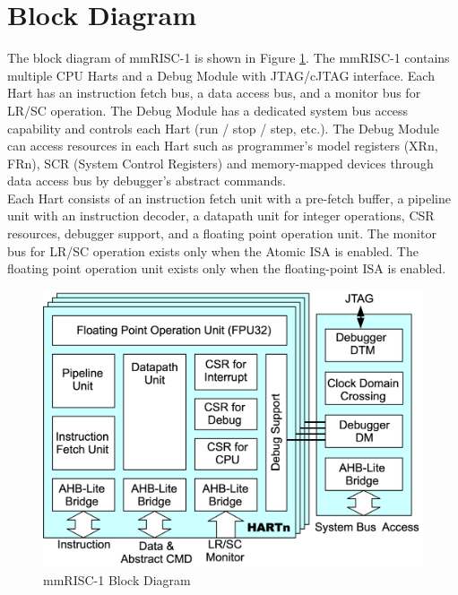 \section{Block Diagram}

The block diagram of  mmRISC-1 is shown in Figure \ref{fig:BLOCKDIAGRAM}. The mmRISC-1 contains multiple CPU Harts and a Debug Module with JTAG/cJTAG interface. Each Hart has an instruction fetch bus, a data access bus, and a monitor bus for LR/SC operation. The Debug Module has a dedicated system bus access capability and controls each Hart (run / stop / step, etc.). The Debug Module can access resources in each Hart such as programmer’s model registers (XRn, FRn), SCR (System Control Registers) and memory-mapped devices through data access bus by debugger’s abstract commands.\\
Each Hart consists of an instruction fetch unit with a pre-fetch buffer, a pipeline unit with an instruction decoder, a datapath unit for integer operations, CSR resources, debugger support, and a floating point operation unit. The monitor bus for LR/SC operation exists only when the Atomic ISA is enabled. The floating point operation unit exists only when the floating-point ISA is enabled.\\

\begin{figure}[H]
    \includegraphics[width=1.00\columnwidth]{./Figure/BlockDiagram.png}
    \caption{mmRISC-1 Block Diagram\protect\footnotemark[1]}
    \label{fig:BLOCKDIAGRAM}
\end{figure}
